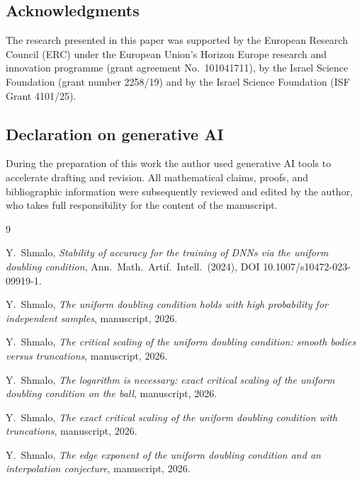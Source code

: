\documentclass[11pt]{article}
\begin{document}
\subsection*{Acknowledgments}
The research presented in this paper was supported by the European Research
Council (ERC) under the European Union's Horizon Europe research and
innovation programme (grant agreement No.\ 101041711), by the Israel Science
Foundation (grant number 2258/19) and by the Israel Science Foundation (ISF
Grant 4101/25).

\subsection*{Declaration on generative AI}
During the preparation of this work the author used generative AI tools to
accelerate drafting and revision.  All mathematical claims, proofs, and
bibliographic information were subsequently reviewed and edited by the author,
who takes full responsibility for the content of the manuscript.

\begin{thebibliography}{9}

Y.~Shmalo,
\emph{Stability of accuracy for the training of DNNs via the uniform doubling
condition},
Ann.\ Math.\ Artif.\ Intell.\ (2024), DOI 10.1007/s10472-023-09919-1.

Y.~Shmalo,
\emph{The uniform doubling condition holds with high probability for
independent samples}, manuscript, 2026.

Y.~Shmalo,
\emph{The critical scaling of the uniform doubling condition: smooth bodies
versus truncations}, manuscript, 2026.

Y.~Shmalo,
\emph{The logarithm is necessary: exact critical scaling of the uniform
doubling condition on the ball}, manuscript, 2026.

Y.~Shmalo,
\emph{The exact critical scaling of the uniform doubling condition with
truncations}, manuscript, 2026.

Y.~Shmalo,
\emph{The edge exponent of the uniform doubling condition and an
interpolation conjecture}, manuscript, 2026.

\end{thebibliography}
\end{document}
